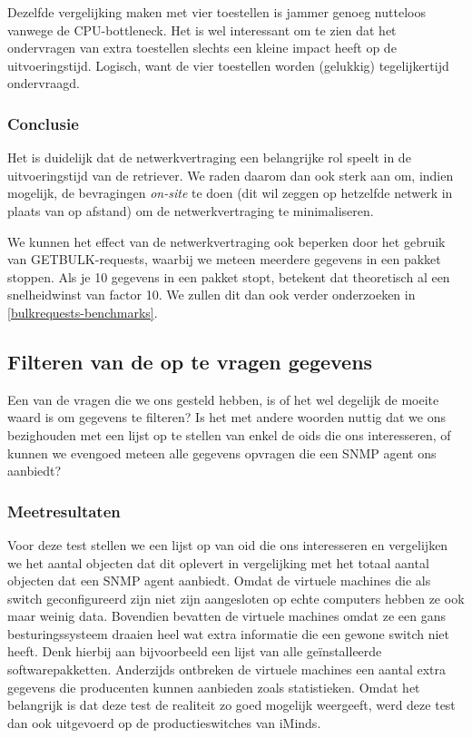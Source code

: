 Dezelfde vergelijking maken met vier toestellen is jammer genoeg nutteloos vanwege de CPU-bottleneck.
Het is wel interessant om te zien dat het ondervragen van extra toestellen slechts een kleine impact heeft op de uitvoeringstijd.
Logisch, want de vier toestellen worden (gelukkig) tegelijkertijd ondervraagd.


\subsubsection{Conclusie}

Het is duidelijk dat de netwerkvertraging een belangrijke rol speelt in de uitvoeringstijd van de retriever.
We raden daarom dan ook sterk aan om, indien mogelijk, de bevragingen \textit{on-site} te doen
(dit wil zeggen op hetzelfde netwerk in plaats van op afstand) om de netwerkvertraging te minimaliseren.

We kunnen het effect van de netwerkvertraging ook beperken door het gebruik van GETBULK-requests,
waarbij we meteen meerdere gegevens in een pakket stoppen.
Als je 10 gegevens in een pakket stopt, betekent dat theoretisch al een snelheidwinst van factor 10.
We zullen dit dan ook verder onderzoeken in \cref{bulkrequests-benchmarks}.





\subsection{Filteren van de op te vragen gegevens}
\label{fracties}

Een van de vragen die we ons gesteld hebben, is of het wel degelijk de moeite waard is om gegevens te filteren?
Is het met andere woorden nuttig dat we ons bezighouden met een lijst op te stellen van enkel de \glspl{oid} die ons interesseren,
of kunnen we evengoed meteen alle gegevens opvragen die een SNMP agent ons aanbiedt?

\subsubsection{Meetresultaten}

Voor deze test stellen we een lijst op van \gls{oid} die ons interesseren en vergelijken we het aantal objecten dat dit oplevert
in vergelijking met het totaal aantal objecten dat een SNMP agent aanbiedt.
Omdat de virtuele machines die als switch geconfigureerd zijn niet zijn aangesloten op echte computers hebben ze ook maar weinig data.
Bovendien bevatten de virtuele machines omdat ze een gans besturingssysteem draaien heel wat extra informatie die een gewone switch niet heeft.
Denk hierbij aan bijvoorbeeld een lijst van alle geïnstalleerde softwarepakketten.
Anderzijds ontbreken de virtuele machines een aantal extra gegevens die producenten kunnen aanbieden zoals statistieken.
Omdat het belangrijk is dat deze test de realiteit zo goed mogelijk weergeeft,
werd deze test dan ook uitgevoerd op de productieswitches van iMinds.

